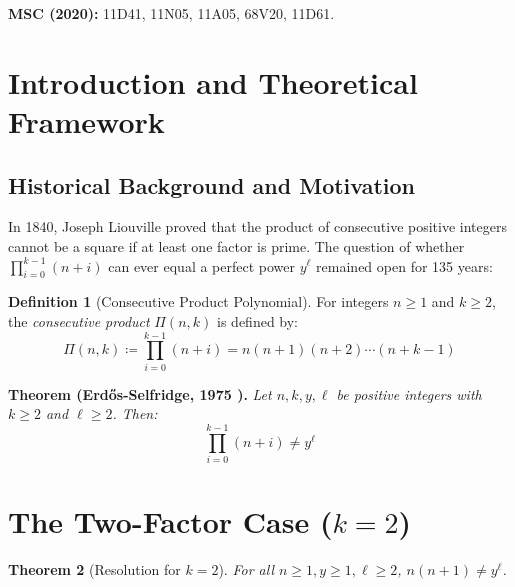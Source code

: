 \documentclass[11pt,a4paper]{article}
\newtheorem{theorem}{Theorem}[section]
\theoremstyle{definition}
\newtheorem{definition}[theorem]{Definition}
\begin{document}
\noindent\textbf{MSC (2020):} 11D41, 11N05, 11A05, 68V20, 11D61.

\tableofcontents
\newpage

\section{Introduction and Theoretical Framework}

\subsection{Historical Background and Motivation}
In 1840, Joseph Liouville \cite{liouville1840} proved that the product of consecutive positive integers cannot be a square if at least one factor is prime.
The question of whether $\prod_{i=0}^{k-1} (n + i)$ can ever equal a perfect power $y^\ell$ remained open for 135 years:

\begin{definition}[Consecutive Product Polynomial]\label{def:consec_prod}
For integers $n \ge 1$ and $k \ge 2$, the \emph{consecutive product} $\Pi(n, k)$ is defined by:
\begin{equation}\label{eq:consec_prod}
\Pi(n, k) \coloneqq \prod_{i=0}^{k - 1} (n + i) = n (n + 1) (n + 2) \cdots (n + k - 1)
\end{equation}
\end{definition}

\noindent\textbf{Theorem (Erd\H{o}s-Selfridge, 1975 \cite{erdos1975selfridge}).} \textit{Let $n, k, y, \ell$ be positive integers with $k \ge 2$ and $\ell \ge 2$. Then:}
\begin{equation}\label{eq:es_main}
\prod_{i=0}^{k - 1} (n + i) \ne y^\ell
\end{equation}

\section{The Two-Factor Case ($k = 2$)}

\begin{theorem}[Resolution for $k = 2$]\label{thm:k2_case}
For all $n \ge 1, y \ge 1, \ell \ge 2$, $n(n + 1) \ne y^\ell$.
\end{theorem}
\end{document}
